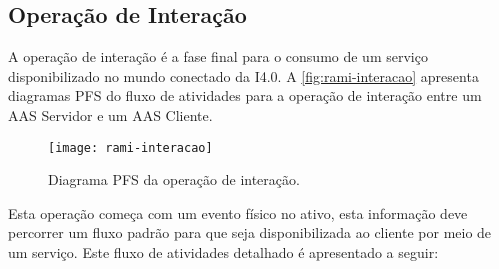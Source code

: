 \subsection{Operação de Interação}

	A operação de interação é a fase final para o consumo de um serviço disponibilizado no mundo conectado da I4.0. A \autoref{fig:rami-interacao} apresenta diagramas PFS do fluxo de atividades para a operação de interação entre um AAS Servidor e um AAS Cliente.
	
	\begin{figure}[htb]
		\centering
		\caption{Diagrama PFS da operação de interação.}
		\label{fig:rami-interacao}
		\texttt{[image: rami-interacao]}
	\end{figure}

	Esta operação começa com um evento físico no ativo, esta informação deve percorrer um fluxo padrão para que seja disponibilizada ao cliente por meio de um serviço. Este fluxo de atividades detalhado é apresentado a seguir:
	
